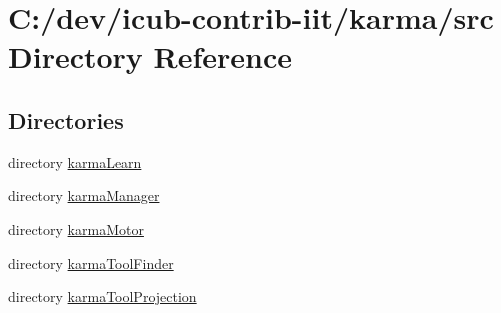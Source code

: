 \section{C\+:/dev/icub-\/contrib-\/iit/karma/src Directory Reference}
\label{dir_68267d1309a1af8e8297ef4c3efbcdba}
\subsection*{Directories}
\begin{DoxyCompactItemize}
\item 
directory \hyperlink{dir_f234616accb428072e31fe708f34c8ab}{karma\+Learn}
\item 
directory \hyperlink{dir_d5fc9e74ecd446ba07279cb903928e76}{karma\+Manager}
\item 
directory \hyperlink{dir_a61e44ac46e7253a0943cfd762c184f9}{karma\+Motor}
\item 
directory \hyperlink{dir_29c9db2f94dd348f3d685c9fccd668c5}{karma\+Tool\+Finder}
\item 
directory \hyperlink{dir_41f00478989b00c299e09b5f630aa3f5}{karma\+Tool\+Projection}
\end{DoxyCompactItemize}
